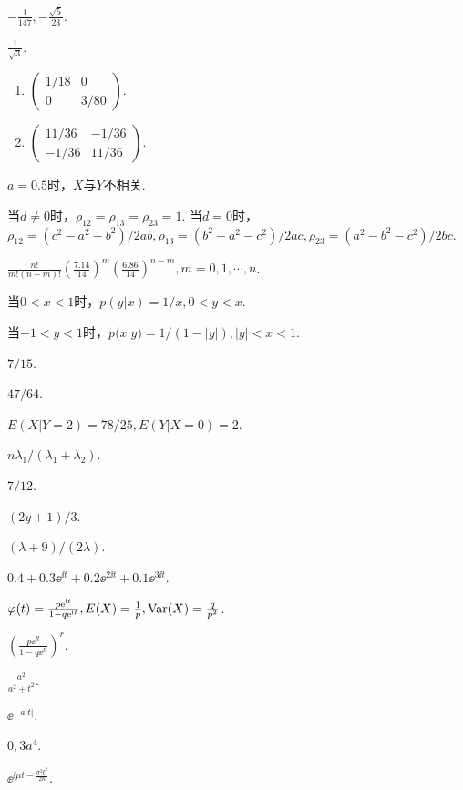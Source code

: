 \begin{answer}
  \item $-\frac1{147},-\frac{\sqrt5}{23}$.
  \item $\frac1{\sqrt3}$.
  \item \begin{enumerate}
    \item $\begin{pmatrix}
      1/18 & 0 \\
      0 & 3/80
    \end{pmatrix}$.
    \item $\begin{pmatrix}
      11/36 & -1/36 \\
      -1/36 & 11/36
    \end{pmatrix}$.
  \end{enumerate}
  \item $a=0.5$时，$X$与$Y$不相关.
  \item 当$d\ne0$时，$\rho_{12}=\rho_{13}=\rho_{23}=1$. 当$d=0$时，$\rho_{12}=(c^2-a^2-b^2)/2ab,\rho_{13}=(b^2-a^2-c^2)/2ac,\rho_{23}
      =(a^2-b^2-c^2)/2bc$.
\end{answer}

\begin{answer}
  \item $\frac{n!}{m!(n-m)!}\left(\frac{7.14}{14}\right)^m
  \left(\frac{6.86}{14}\right)^{n-m},m=0,1,\cdots,n$.
  \item 当$0<x<1$时，$p(y|x)=1/x,0<y<x$.
  \item 当$-1<y<1$时，$p(x|y)=1/(1-|y|),|y|<x<1$.
  \item $7/15$.
  \item $47/64$.
  \item $E(X|Y=2)=78/25,E(Y|X=0)=2$.
  \item $n\lambda_1/(\lambda_1+\lambda_2)$.
  \item $7/12$.
  \item $(2y+1)/3$.
  \item $(\lambda+9)/(2\lambda)$.
\end{answer}


\begin{answer}
  \item $0.4+0.3\ee^{\ii t}+0.2\ee^{2\ii t}+0.1\ee^{3\ii t}$.
  \item $\varphi(t)=\frac{p\mathrm e^{\mathrm i t}}{1-q\mathrm e^{\mathrm i t}},E(X)=\frac1p,\operatorname{Var}(X)=\frac q{p^2}$.
  \item $\left( \frac{p\ee^{\ii t}}{1-q\ee^{\ii t}} \right)^r$.
  \item \begin{enumerate*}
    \item $\frac{a^2}{a^2+t^2}$.
    \item $\ee^{-a|t|}$.
  \end{enumerate*}
  \item $0,3a^4$.
  \setcounter{enumi}{12}
  \item $\ee^{\ii\mu t-\frac{\sigma^2t^2}{2n}}$.
\end{answer}

